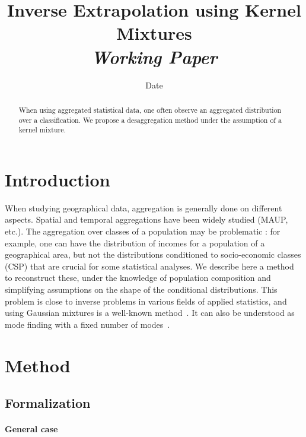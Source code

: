 


\title{Inverse Extrapolation using Kernel Mixtures\bigskip\\
\textit{Working Paper}
}
\author{}
\date{Date}


\maketitle

\justify


\begin{abstract}
When using aggregated statistical data, one often observe an aggregated distribution over a classification. We propose a desaggregation method under the assumption of a kernel mixture.
\end{abstract}


\section{Introduction}

When studying geographical data, aggregation is generally done on different aspects. Spatial and temporal aggregations have been widely studied (MAUP, etc.). The aggregation over classes of a population may be problematic : for example, one can have the distribution of incomes for a population of a geographical area, but not the distributions conditioned to socio-economic classes (CSP) that are crucial for some statistical analyses. We describe here a method to reconstruct these, under the knowledge of population composition and simplifying assumptions on the shape of the conditional distributions. This problem is close to inverse problems in various fields of applied statistics, and using Gaussian mixtures is a well-known method~\cite{yu2012solving}. It can also be understood as mode finding with a fixed number of modes~\cite{carreira2000mode}.


\section{Method}

\subsection{Formalization}

\paragraph{General case}

